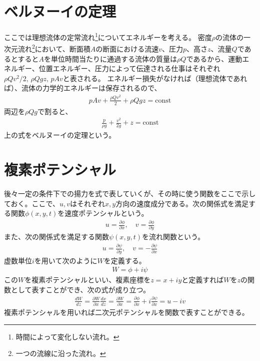 \documentclass[10pt,b5paper,papersize,dvipdfmx]{jsbook}
\begin{document}
\section{ベルヌーイの定理}
ここでは理想流体の定常流れ\footnote{時間によって変化しない流れ。}についてエネルギーを考える。
密度$\rho$の流体の一次元流れ\footnote{一つの流線に沿った流れ。}において、断面積$A$の断面における流速$v$、圧力$p$、高さ$z$、流量$Q$であるとすると$A$を単位時間当たりに通過する流体の質量は$\rho Q$であるから、運動エネルギー、位置エネルギー、圧力によって伝達される仕事はそれぞれ$\rho Qv^2/2,\, \rho Qgz,\, pAv$と表される。
エネルギー損失がなければ（理想流体であれば）、流体の力学的エネルギーは保存されるので、
\begin{align}
  pAv + \frac{\rho Qv^2}{2} + \rho Qgz = \text{const}
\end{align}
両辺を$\rho Qg$で割ると、
\begin{align}
  \frac{p}{\rho g} + \frac{v^2}{2g} + z = \text{const}
\end{align}
上の式をベルヌーイの定理という。
\section{複素ポテンシャル}
後々一定の条件下での揚力を式で表していくが、その時に使う関数をここで示しておく。ここで、$u, v$はそれぞれ$x, y$方向の速度成分である。次の関係式を満足する関数$\phi(x,y,t)$を速度ポテンシャルという。
\begin{align}
  u = \frac{\partial\phi}{\partial x},\quad
  v = \frac{\partial\phi}{\partial y}
\end{align}
また、次の関係式を満足する関数$\psi(x,y,t)$を流れ関数という。
\begin{align}
  u = \frac{\partial\psi}{\partial y},\quad
  v = -\frac{\partial\psi}{\partial x}
\end{align}
虚数単位$i$を用いて次のように$W$を定義する。
\begin{align}
  W = \phi+i\psi
\end{align}
この$W$を複素ポテンシャルといい、複素座標を$z = x+iy$と定義すれば$W$を$z$の関数として表すことができ、次の式が成り立つ。
\begin{align}
  \frac{dW}{dz}
  = \frac{\partial W}{\partial x} \frac{dx}{dz}
  = \frac{\partial W}{\partial x}
  = \frac{\partial\phi}{\partial x} + i\frac{\partial\psi}{\partial x}
  = u - iv
\end{align}
複素ポテンシャルを用いれば二次元ポテンシャルを関数で表すことができる。
\end{document}
